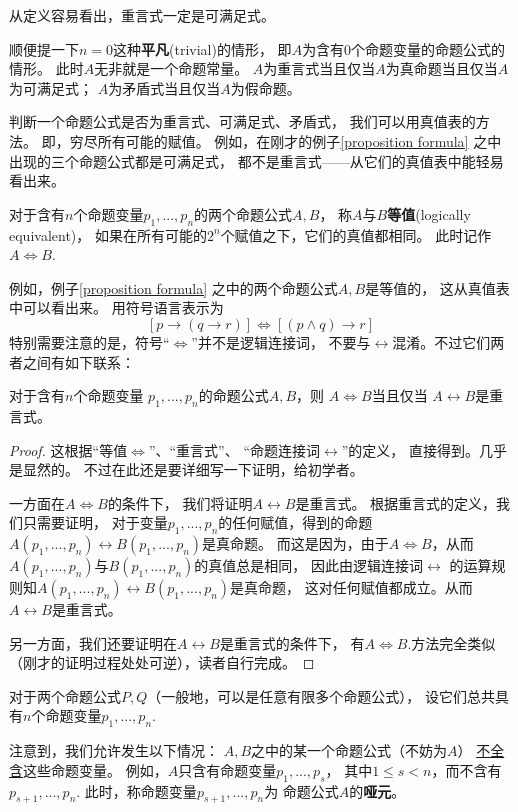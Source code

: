 从定义容易看出，重言式一定是可满足式。

顺便提一下$n=0$这种\textbf{平凡}(trivial)的情形，
即$A$为含有0个命题变量的命题公式的情形。
此时$A$无非就是一个命题常量。
$A$为重言式当且仅当$A$为真命题当且仅当$A$为可满足式；
$A$为矛盾式当且仅当$A$为假命题。\vs

判断一个命题公式是否为重言式、可满足式、矛盾式，
我们可以用真值表的方法。
即，穷尽所有可能的赋值。
例如，在刚才的例子\ref{proposition formula}
之中出现的三个命题公式都是可满足式，
都不是重言式——从它们的真值表中能轻易看出来。

\begin{definition}[命题公式的等值]
对于含有$n$个命题变量$p_1,...,p_n$的两个命题公式$A,B$，
称$A$与$B$\textbf{等值}(logically equivalent)，
如果在所有可能的$2^n$个赋值之下，它们的真值都相同。
此时记作$A\Leftrightarrow B$.
\end{definition}
例如，例子\ref{proposition formula}
之中的两个命题公式$A,B$是等值的，
这从真值表中可以看出来。
用符号语言表示为
$$[p\rightarrow (q\rightarrow r)]
\Leftrightarrow [(p\wedge q)\rightarrow r]$$
特别需要注意的是，符号“$\Leftrightarrow$”并不是逻辑连接词，
不要与$\leftrightarrow$混淆。不过它们两者之间有如下联系：

\begin{thm}对于含有$n$个命题变量
$p_1,...,p_n$的命题公式$A,B$，则
$A\Leftrightarrow B$当且仅当
$A\leftrightarrow B$是重言式。
\end{thm}
\begin{proof}
这根据“等值$\Leftrightarrow$”、“重言式”、
“命题连接词$\leftrightarrow$”的定义，
直接得到。几乎是显然的。
不过在此还是要详细写一下证明，给初学者。

一方面在$A\Leftrightarrow B$的条件下，
我们将证明$A\leftrightarrow B$是重言式。
根据重言式的定义，我们只需要证明，
对于变量$p_1,...,p_n$的任何赋值，得到的命题
$A(p_1,...,p_n)\leftrightarrow B(p_1,...,p_n)$是真命题。
而这是因为，由于$A\Leftrightarrow B$，从而
$A(p_1,...,p_n)$与$B(p_1,...,p_n)$的真值总是相同，
因此由逻辑连接词$\leftrightarrow$
的运算规则知$A(p_1,...,p_n)
\leftrightarrow B(p_1,...,p_n)$是真命题，
这对任何赋值都成立。从而$A\leftrightarrow B$是重言式。

另一方面，我们还要证明在$A\leftrightarrow B$是重言式的条件下，
有$A\Leftrightarrow B$.方法完全类似
（刚才的证明过程处处可逆），读者自行完成。
\end{proof}

\begin{rem}[关于命题公式的命题变量个数]
对于两个命题公式$P,Q$（一般地，可以是任意有限多个命题公式），
设它们总共具有$n$个命题变量$p_1,...,p_n$.

注意到，我们允许发生以下情况：
$A,B$之中的某一个命题公式（不妨为$A$）
\underline{不全含}这些命题变量。
例如，$A$只含有命题变量$p_1,...,p_s$，
其中$1\leq s<n$，而不含有$p_{s+1},...,p_{n}$.
此时，称命题变量$p_{s+1},...,p_{n}$为
命题公式$A$的\textbf{哑元}。
\end{rem}


